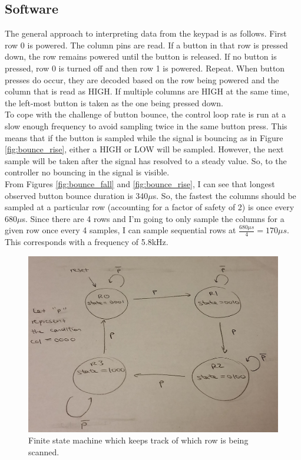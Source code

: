 \documentclass[11pt]{article}
\begin{document}
\subsection{Software}

The general approach to interpreting data from the keypad is as follows. First row 0 is powered. The column pins are read. If a button in that row is pressed down, the row remains powered until the button is released. If no button is pressed, row 0 is turned off and then row 1 is powered. Repeat. When button presses do occur, they are decoded based on the row being powered and the column that is read as HIGH. If multiple columns are HIGH at the same time, the left-most button is taken as the one being pressed down. \\

To cope with the challenge of button bounce, the control loop rate is run at a slow enough frequency to avoid sampling twice in the same button press. This means that if the button is sampled while the signal is bouncing as in Figure \ref{fig:bounce_rise}, either a HIGH or LOW will be sampled. However, the next sample will be taken after the signal has resolved to a steady value. So, to the controller no bouncing in the signal is visible. \\

From Figures \ref{fig:bounce_fall} and \ref{fig:bounce_rise}, I can see that longest observed button bounce duration is 340$\mu$s. So, the fastest the columns should be sampled at a particular row (accounting for a factor of safety of 2) is once every 680$\mu$s. Since there are 4 rows and I'm going to only sample the columns for a given row once every 4 samples, I can sample sequential rows at $\frac{680\mu s}{4}=170\mu s$. This corresponds with a frequency of 5.8kHz.

\begin{figure}[h!]
\centering
\includegraphics[scale=0.2]{fsm.jpg}
\caption{Finite state machine which keeps track of which row is being scanned.}
\label{fig:fsm}
\end{figure} 
\end{document}
